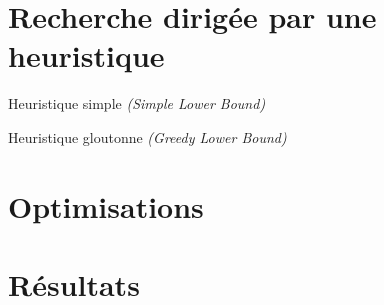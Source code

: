     \section{Recherche dirigée par une heuristique}
        \begin{frame}{Heuristique simple \textit{(Simple Lower Bound)}}
        \end{frame}

        \begin{frame}{Heuristique gloutonne \textit{(Greedy Lower Bound)}}
        \end{frame}

    \section{Optimisations}
        \begin{frame}{}
        \end{frame}

    \section{Résultats}

